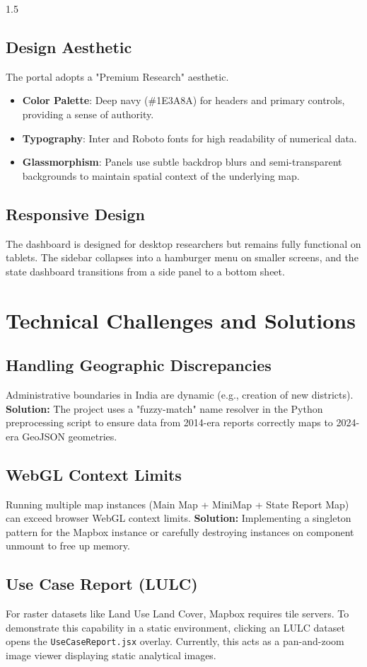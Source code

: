 \documentclass[12pt,a4paper]{report}
\begin{document}
\begin{spacing}{1.5}
\section{Design Aesthetic}
The portal adopts a "Premium Research" aesthetic. 
\begin{itemize}
    \item \textbf{Color Palette}: Deep navy (\#1E3A8A) for headers and primary controls, providing a sense of authority.
    \item \textbf{Typography}: Inter and Roboto fonts for high readability of numerical data.
    \item \textbf{Glassmorphism}: Panels use subtle backdrop blurs and semi-transparent backgrounds to maintain spatial context of the underlying map.
\end{itemize}

\section{Responsive Design}
The dashboard is designed for desktop researchers but remains fully functional on tablets. The sidebar collapses into a hamburger menu on smaller screens, and the state dashboard transitions from a side panel to a bottom sheet.

\chapter{Technical Challenges and Solutions}

\section{Handling Geographic Discrepancies}
Administrative boundaries in India are dynamic (e.g., creation of new districts). 
\textbf{Solution:} The project uses a "fuzzy-match" name resolver in the Python preprocessing script to ensure data from 2014-era reports correctly maps to 2024-era GeoJSON geometries.

\section{WebGL Context Limits}
Running multiple map instances (Main Map + MiniMap + State Report Map) can exceed browser WebGL context limits.
\textbf{Solution:} Implementing a singleton pattern for the Mapbox instance or carefully destroying instances on component unmount to free up memory.

\section{Use Case Report (LULC)}
For raster datasets like Land Use Land Cover, Mapbox requires tile servers. To demonstrate this capability in a static environment, clicking an LULC dataset opens the \texttt{UseCaseReport.jsx} overlay. Currently, this acts as a pan-and-zoom image viewer displaying static analytical images.


\end{spacing}
\end{document}

